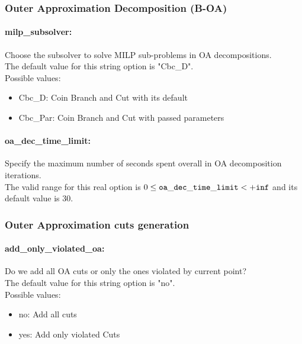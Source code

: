 \subsubsection{Outer Approximation Decomposition (B-OA)}
\label{sec:Outer_Approximation_Decomposition_(B-OA)}

\paragraph{milp\_subsolver:}\label{sec:milp_subsolver} Choose the subsolver to solve MILP sub-problems in OA decompositions. $\;$ \\
The default value for this string option is "Cbc\_D".
\\ 
Possible values:
\begin{itemize}
   \item Cbc\_D: Coin Branch and Cut with its default
   \item Cbc\_Par: Coin Branch and Cut with passed parameters
\end{itemize}

\paragraph{oa\_dec\_time\_limit:}\label{sec:oa_dec_time_limit} Specify the maximum number of seconds spent overall in OA decomposition iterations. $\;$ \\
 The valid range for this real option is 
$0 \le {\tt oa\_dec\_time\_limit } <  {\tt +inf}$
and its default value is $30$.


\subsubsection{Outer Approximation cuts generation}
\label{sec:Outer_Approximation_cuts_generation}

\paragraph{add\_only\_violated\_oa:}\label{sec:add_only_violated_oa} Do we add all OA cuts or only the ones violated by current point? $\;$ \\
The default value for this string option is "no".
\\ 
Possible values:
\begin{itemize}
   \item no: Add all cuts
   \item yes: Add only violated Cuts
\end{itemize}

